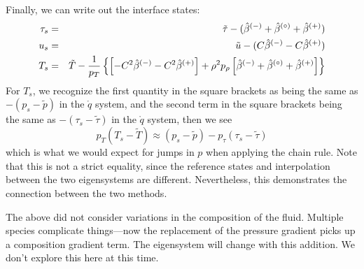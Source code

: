 Finally, we can write out the interface states:
\begin{eqnarray}
\tau_s &=& \tilde{\tau} - (\hat{\beta}^\evm + \hat{\beta}^\evz + \hat{\beta}^\evp) \\
%
u_s &=& \tilde{u} - (C \hat{\beta}^\evm - C \hat{\beta}^\evp) \\
%
T_s &=& \tilde{T} - \frac{1}{p_T} \left \{
   \left [ -C^2 \hat{\beta}^\evm - C^2 \hat{\beta}^\evp \right ] +
   \rho^2 p_\rho \left [ \hat{\beta}^\evm + \hat{\beta}^\evz + \hat{\beta}^\evp \right ] \right \}
\end{eqnarray}
For $T_s$, we recognize the first quantity in the square brackets as
being the same as $-(p_s - \tilde{p})$ in the $\mathring{q}$ system, and the
second term in the square brackets being the same as $-(\tau_s - \tilde{\tau})$
in the $\mathring{q}$ system, then we see
\begin{equation}
p_T (T_s - \tilde{T} ) \approx (p_s - \tilde{p} ) - p_\tau (\tau_s - \tilde{\tau})
\end{equation}
which is what we would expect for jumps in $p$ when applying the chain
rule.  Note that this is not a strict equality, since the reference
states and interpolation between the two eigensystems are different.
Nevertheless, this demonstrates the connection between the two
methods.

The above did not consider variations in the composition of the fluid.
Multiple species complicate things---now the replacement of the
pressure gradient picks up a composition gradient term.
The eigensystem will change with this addition.  We don't explore this here at this
time.

